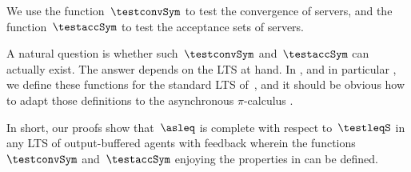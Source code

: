 We use the function~$\testconvSym$ to test the convergence of servers, and the
function~$\testaccSym$ to test the acceptance sets of servers.

A natural question is whether such~$\testconvSym$ and~$\testaccSym$ can actually exist.
The answer depends on the LTS at hand. In ,
and in particular , we define these functions for
the standard LTS of~\ACCS, and it should be obvious how to adapt those
definitions to the asynchronous $\pi$-calculus \cite{DBLP:journals/jlp/Hennessy05}.

In short, our proofs show that~$\asleq$ is complete with respect to~$\testleqS$
in any LTS of output-buffered agents with feedback wherein the
functions~$\testconvSym$ and~$\testaccSym$ enjoying the properties in
 can be defined.











